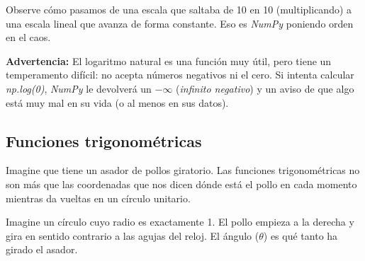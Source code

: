 Observe cómo pasamos de una escala que saltaba de 10 en 10 (multiplicando) a una escala lineal que avanza de forma constante. Eso es \textit{NumPy} poniendo orden en el caos.

\begin{nota}
    \textbf{Advertencia:} El logaritmo natural es una función muy útil, pero tiene un temperamento difícil: no acepta números negativos ni el cero. Si intenta calcular \textit{np.log(0)}, \textit{NumPy} le devolverá un \(-\infty\) (\textit{infinito negativo}) y un aviso de que algo está muy mal en su vida (o al menos en sus datos).
\end{nota}


\subsection{Funciones trigonométricas}

Imagine que tiene un asador de pollos giratorio. Las funciones trigonométricas no son más que las coordenadas que nos dicen dónde está el pollo en cada momento mientras da vueltas en un círculo unitario.

Imagine un círculo cuyo radio es exactamente 1. El pollo empieza a la derecha y gira en sentido contrario a las agujas del reloj. El ángulo (\(\theta\)) es qué tanto ha girado el asador.



